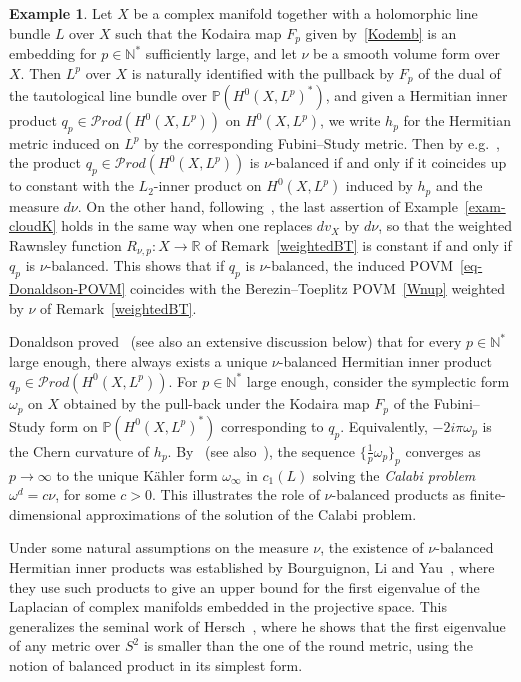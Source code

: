 \documentclass[11pt]{article}
\theoremstyle{definition}
\newtheorem{exam}[theo]{Example}
\numberwithin{equation}{section}
\numberwithin{figure}{section}
\numberwithin{table}{section}
\newcommand{\PPP}{{\mathbb{P}}}
\newcommand{\R}{{\mathbb{R}}}
\newcommand{\N}{{\mathbb{N}}}
\newcommand{\om}{{\omega}}
\newcommand\< {\mathcal{h}}
\renewcommand\> {\mathcal{i}}
\newcommand{\Prod}{{\mathcal Prod}}
\begin{document}
\begin{exam}\label{exam-balanced}
Let $X$ be a complex manifold together with a holomorphic line bundle $L$ over $X$ such that the Kodaira map $F_p$ given by~\eqref{Kodemb} is an embedding for $p\in\N^*$ sufficiently large, and let $\nu$ be a smooth volume form over $X$. Then $L^p$ over $X$ is naturally identified with the pullback by $F_p$ of the dual of the tautological line bundle over $\PPP(H^0(X,L^p)^*)$, and given a Hermitian inner product $q_p\in\Prod(H^0(X,L^p))$ on $H^0(X,L^p)$, we write $h_p$ for the Hermitian metric induced on $L^p$ by the corresponding Fubini--Study metric. Then by e.g.~\cite[p.~581]{D}, the product $q_p\in\Prod(H^0(X,L^p))$ is $\nu$-balanced if and only if it coincides up to constant with the $L_2$-inner product on $H^0(X,L^p)$ induced by $h_p$ and the measure $d\nu$. On the other hand, following~\cite[Section~4.19, Section~5.1.4]{MM07}, the last assertion of Example~\ref{exam-cloudK} holds in the same way when one replaces $dv_X$ by $d\nu$, so that the weighted Rawnsley function $R_{\nu,p}:X\rightarrow\R$ of Remark~\ref{weightedBT} is constant if and only if $q_p$ is $\nu$-balanced. This shows that if $q_p$ is $\nu$-balanced, the induced POVM~\eqref{eq-Donaldson-POVM} coincides with the Berezin--Toeplitz POVM~\eqref{Wnup} weighted by $\nu$ of Remark~\ref{weightedBT}.

Donaldson proved~\cite[p.~582]{D} (see also an extensive discussion below) that for every $p\in\N^*$ large enough, there always exists a unique $\nu$-balanced Hermitian inner product $q_p\in\Prod(H^0(X,L^p))$. For $p\in\N^*$ large enough, consider the symplectic form $\omega_p$ on $X$ obtained by the pull-back under the Kodaira map $F_p$ of the Fubini--Study form on $\PPP(H^0(X,L^p)^*)$ corresponding to $q_p$. Equivalently, $-2i\pi\om_p$ is the Chern curvature of $h_p$. By~\cite[p.~584]{D} (see also~\cite{Keller09}), the sequence $\{\frac{1}{p}\omega_p\}_p$ converges as $p\rightarrow\infty$ to the unique K\"ahler form $\om_\infty$ in $c_1(L)$ solving the \emph{Calabi problem} $\om^d=c\nu$, for some $c>0$. This illustrates the role of $\nu$-balanced products as finite-dimensional approximations of the solution of the Calabi problem.
\end{exam}


Under some natural assumptions on the measure $\nu$, the existence of $\nu$-balanced Hermitian inner products was established by Bourguignon, Li and Yau~\cite{BLY94}, where they use such products to give an upper bound for the first eigenvalue of the Laplacian of complex manifolds embedded in the projective space. This generalizes the seminal work of Hersch~\cite{Her70}, where he shows that the first eigenvalue of any metric over $S^2$ is smaller than the one of the round metric, using the notion of balanced product in its simplest form.
\end{document}
